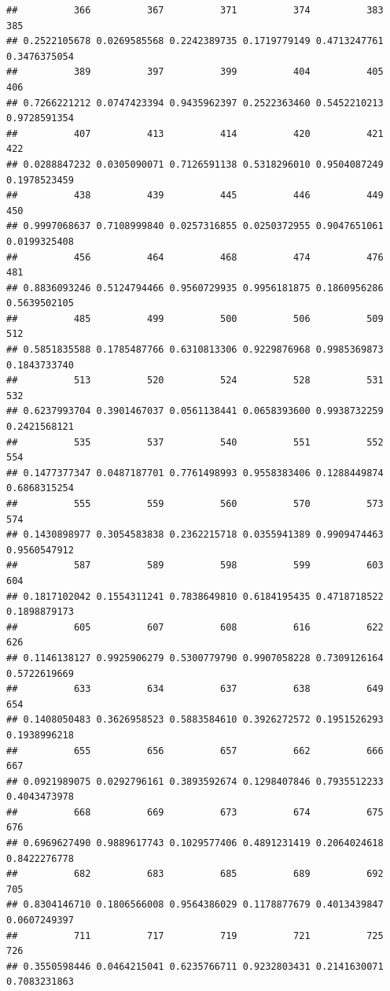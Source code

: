 \documentclass[
]{article}
\begin{document}
\begin{verbatim}
##          366          367          371          374          383          385 
## 0.2522105678 0.0269585568 0.2242389735 0.1719779149 0.4713247761 0.3476375054 
##          389          397          399          404          405          406 
## 0.7266221212 0.0747423394 0.9435962397 0.2522363460 0.5452210213 0.9728591354 
##          407          413          414          420          421          422 
## 0.0288847232 0.0305090071 0.7126591138 0.5318296010 0.9504087249 0.1978523459 
##          438          439          445          446          449          450 
## 0.9997068637 0.7108999840 0.0257316855 0.0250372955 0.9047651061 0.0199325408 
##          456          464          468          474          476          481 
## 0.8836093246 0.5124794466 0.9560729935 0.9956181875 0.1860956286 0.5639502105 
##          485          499          500          506          509          512 
## 0.5851835588 0.1785487766 0.6310813306 0.9229876968 0.9985369873 0.1843733740 
##          513          520          524          528          531          532 
## 0.6237993704 0.3901467037 0.0561138441 0.0658393600 0.9938732259 0.2421568121 
##          535          537          540          551          552          554 
## 0.1477377347 0.0487187701 0.7761498993 0.9558383406 0.1288449874 0.6868315254 
##          555          559          560          570          573          574 
## 0.1430898977 0.3054583838 0.2362215718 0.0355941389 0.9909474463 0.9560547912 
##          587          589          598          599          603          604 
## 0.1817102042 0.1554311241 0.7838649810 0.6184195435 0.4718718522 0.1898879173 
##          605          607          608          616          622          626 
## 0.1146138127 0.9925906279 0.5300779790 0.9907058228 0.7309126164 0.5722619669 
##          633          634          637          638          649          654 
## 0.1408050483 0.3626958523 0.5883584610 0.3926272572 0.1951526293 0.1938996218 
##          655          656          657          662          666          667 
## 0.0921989075 0.0292796161 0.3893592674 0.1298407846 0.7935512233 0.4043473978 
##          668          669          673          674          675          676 
## 0.6969627490 0.9889617743 0.1029577406 0.4891231419 0.2064024618 0.8422276778 
##          682          683          685          689          692          705 
## 0.8304146710 0.1806566008 0.9564386029 0.1178877679 0.4013439847 0.0607249397 
##          711          717          719          721          725          726 
## 0.3550598446 0.0464215041 0.6235766711 0.9232803431 0.2141630071 0.7083231863 

\end{verbatim}
\end{document}
